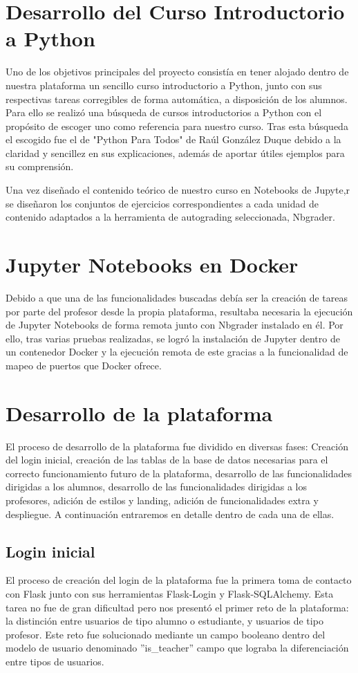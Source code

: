 \section{Desarrollo del Curso Introductorio a Python}
Uno de los objetivos principales del proyecto consistía en tener alojado dentro de nuestra plataforma un sencillo curso introductorio a Python, junto con sus respectivas tareas corregibles de forma automática, a disposición de los alumnos. Para ello se realizó una búsqueda de cursos introductorios a Python con el propósito de escoger uno como referencia para nuestro curso. Tras esta búsqueda el escogido fue el de "Python Para Todos" \cite{PythonParaTodos} de Raúl González Duque debido a la claridad y sencillez en sus explicaciones, además de aportar útiles ejemplos para su comprensión.

Una vez diseñado el contenido teórico de nuestro curso en Notebooks de Jupyte,r se diseñaron los conjuntos de ejercicios correspondientes a cada unidad de contenido adaptados a la herramienta de autograding seleccionada, Nbgrader.


\section{Jupyter Notebooks en Docker}
Debido a que una de las funcionalidades buscadas debía ser la creación de tareas por parte del profesor desde la propia plataforma, resultaba necesaria la ejecución de Jupyter Notebooks de forma remota junto con Nbgrader instalado en él. Por ello, tras varias pruebas realizadas, se logró la instalación de Jupyter dentro de un contenedor Docker y la ejecución remota de este gracias a la funcionalidad de mapeo de puertos que Docker ofrece.



\section{Desarrollo de la plataforma}
El proceso de desarrollo de la plataforma fue dividido en diversas fases: Creación del login inicial, creación de las tablas de la base de datos necesarias para el correcto funcionamiento futuro de la plataforma, desarrollo de las funcionalidades dirigidas a los alumnos, desarrollo de las funcionalidades dirigidas a los profesores, adición de estilos y landing, adición de funcionalidades extra y despliegue. A continuación entraremos en detalle dentro de cada una de ellas.

\subsection{Login inicial}
El proceso de creación del login de la plataforma fue la primera toma de contacto con Flask junto con sus herramientas Flask-Login y Flask-SQLAlchemy. Esta tarea no fue de gran dificultad pero nos presentó el primer reto de la plataforma: la distinción entre usuarios de tipo alumno o estudiante, y usuarios de tipo profesor. Este reto fue solucionado mediante un campo booleano dentro del modelo de usuario denominado ''is\_teacher'' campo que lograba la diferenciación entre tipos de usuarios.

